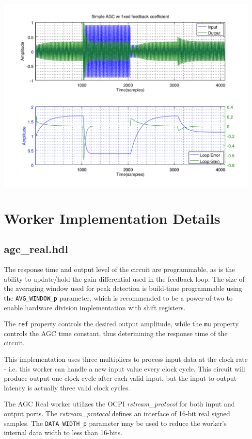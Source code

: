 \documentclass{article}
\def\comp{agc\_real}
\begin{document}
	{\centering\captionsetup{type=figure}\includegraphics[scale=0.5]{agc_matlab}\par{}\label{fig:ideal}}

\section*{Worker Implementation Details}
\subsection*{\comp.hdl}
\begin{flushleft}
	The response time and output level of the circuit are programmable, as is the ability to update/hold the gain differential used in the feedback loop. The size of the averaging window used for peak detection is build-time programmable using the \verb+AVG_WINDOW_p+ parameter, which is recommended to be a power-of-two to enable hardware division implementation with shift registers.\medskip

	The \verb+ref+ property controls the desired output amplitude, while the \verb+mu+ property controls the AGC time constant, thus determining the response time of the circuit.\medskip

	This implementation uses three multipliers to process input data at the clock rate - i.e. this worker can handle a new input value every clock cycle. This circuit will produce output one clock cycle after each valid input, but the input-to-output latency is actually three valid clock cycles.\medskip

	The AGC Real worker utilizes the OCPI \textit{rstream\_protocol} for both input and output ports. The \textit{rstream\_protocol} defines an interface of 16-bit real signed samples. The \verb+DATA_WIDTH_p+ parameter may be used to reduce the worker's internal data width to less than 16-bits.
\end{flushleft}
\end{document}
